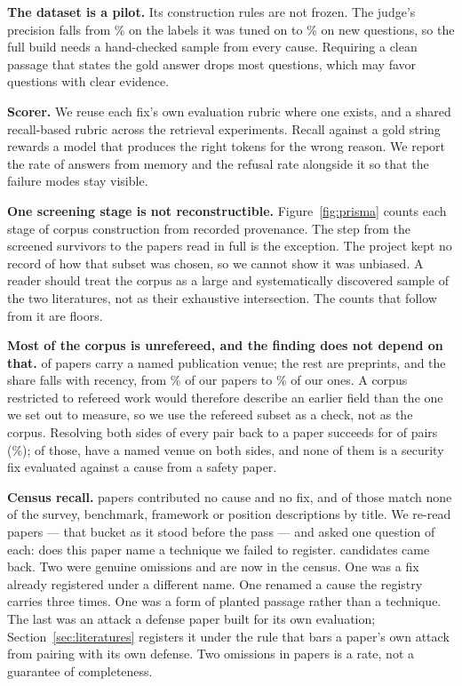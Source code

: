 \textbf{The dataset is a pilot.} Its construction rules are not frozen. The
judge's precision falls from \PctSdJudgePrec{}\% on the labels it was tuned on
to \PctSdTwoJudgePrec{}\% on new questions, so the full build needs a
hand-checked sample from every cause. Requiring a clean passage that states
the gold answer drops most questions, which may favor questions with clear
evidence.

\textbf{Scorer.} We reuse each fix's own evaluation rubric where one
exists, and a shared recall-based rubric across the retrieval experiments. Recall
against a gold string rewards a model that produces the right tokens for the
wrong reason. We report the rate of answers from memory and the refusal
rate alongside it so that the failure modes stay visible.

\textbf{One screening stage is not reconstructible.} Figure~\ref{fig:prisma}
counts each stage of corpus construction from recorded provenance. The step
from the \NSurvived{} screened survivors to the \NFullText{} papers read in
full is the exception. The project kept no record of how that subset was
chosen, so we cannot show it was unbiased. A reader should treat the corpus as
a large and systematically discovered sample of the two literatures, not as
their exhaustive intersection. The counts that follow from it are floors.

\textbf{Most of the corpus is unrefereed, and the finding does not depend on
that.} \NVenuePapers{} of \NCorpus{} papers carry a named publication venue;
the rest are preprints, and the share falls with recency, from
\PctVenueEarly{}\% of our \YearVenueEarly{} papers to \PctVenueLate{}\% of
our \YearVenueLate{} ones. A corpus restricted to refereed work
would therefore describe an earlier field than the one we set out to measure,
so we use the refereed subset as a check, not as the corpus. Resolving both sides of
every pair back to a paper succeeds for \NVenueResolved{} of
\NTimelinePairs{} pairs (\PctVenueResolved{}\%); of those, \NVenuePairs{} have
a named venue on both sides, and none of them is a security fix evaluated
against a cause from a safety paper.

\textbf{Census recall.} \NNoTechnique{} papers contributed no cause and no fix, and
\NNoTechOther{} of those match none of the survey, benchmark, framework or
position descriptions by title. We re-read \NRecallRead{} papers --- that
bucket as it stood before the pass --- and asked one question of each: does
this paper name a technique we failed to register. \NRecallCandidates{}
candidates came back. Two were genuine omissions and are now in the census. One was
a fix already registered under a different name. One renamed a cause
the registry carries three times. One was a form of planted passage rather than a
technique. The last was an attack a defense paper built for its own
evaluation; Section~\ref{sec:literatures} registers it under the rule that
bars a paper's own attack from pairing with its own defense. Two omissions in
\NRecallRead{} papers is a rate, not a guarantee of completeness.

